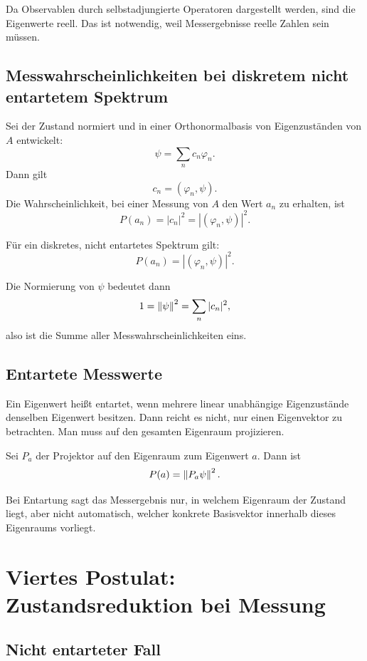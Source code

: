 Da Observablen durch selbstadjungierte Operatoren dargestellt werden, sind die Eigenwerte reell. Das ist notwendig, weil Messergebnisse reelle Zahlen sein müssen.

\subsection{Messwahrscheinlichkeiten bei diskretem nicht entartetem Spektrum}

Sei der Zustand normiert und in einer Orthonormalbasis von Eigenzuständen von $A$ entwickelt:
\[
    \psi=\sum_n c_n\varphi_n.
\]
Dann gilt
\[
    c_n=(\varphi_n,\psi).
\]
Die Wahrscheinlichkeit, bei einer Messung von $A$ den Wert $a_n$ zu erhalten, ist
\[
    P(a_n)=|c_n|^2=|(\varphi_n,\psi)|^2.
\]

\begin{formulabox}
Für ein diskretes, nicht entartetes Spektrum gilt:
\[
    P(a_n)=|(\varphi_n,\psi)|^2.
\]
\end{formulabox}

Die Normierung von $\psi$ bedeutet dann
\[
    1=\left\lVert \psi \right\rVert^2=\sum_n |c_n|^2,
\]
also ist die Summe aller Messwahrscheinlichkeiten eins.

\subsection{Entartete Messwerte}

Ein Eigenwert heißt entartet, wenn mehrere linear unabhängige Eigenzustände denselben Eigenwert besitzen. Dann reicht es nicht, nur einen Eigenvektor zu betrachten. Man muss auf den gesamten Eigenraum projizieren.

Sei $P_a$ der Projektor auf den Eigenraum zum Eigenwert $a$. Dann ist
\[
    P(a)=\left\lVert P_a\psi \right\rVert^2.
\]

\begin{conceptbox}
Bei Entartung sagt das Messergebnis nur, in welchem Eigenraum der Zustand liegt, aber nicht automatisch, welcher konkrete Basisvektor innerhalb dieses Eigenraums vorliegt.
\end{conceptbox}

\section{Viertes Postulat: Zustandsreduktion bei Messung}

\subsection{Nicht entarteter Fall}

